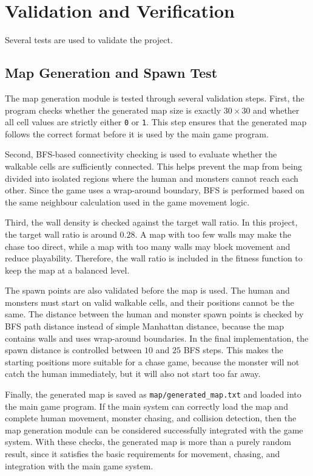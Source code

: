 \section{Validation and Verification}

Several tests are used to validate the project.

\subsection{Map Generation and Spawn Test}

The map generation module is tested through several validation steps. First, the program checks whether the generated map size is exactly $30 \times 30$ and whether all cell values are strictly either \texttt{0} or \texttt{1}. This step ensures that the generated map follows the correct format before it is used by the main game program.

Second, BFS-based connectivity checking is used to evaluate whether the walkable cells are sufficiently connected. This helps prevent the map from being divided into isolated regions where the human and monsters cannot reach each other. Since the game uses a wrap-around boundary, BFS is performed based on the same neighbour calculation used in the game movement logic.

Third, the wall density is checked against the target wall ratio. In this project, the target wall ratio is around $0.28$. A map with too few walls may make the chase too direct, while a map with too many walls may block movement and reduce playability. Therefore, the wall ratio is included in the fitness function to keep the map at a balanced level.

The spawn points are also validated before the map is used. The human and monsters must start on valid walkable cells, and their positions cannot be the same. The distance between the human and monster spawn points is checked by BFS path distance instead of simple Manhattan distance, because the map contains walls and uses wrap-around boundaries. In the final implementation, the spawn distance is controlled between $10$ and $25$ BFS steps. This makes the starting positions more suitable for a chase game, because the monster will not catch the human immediately, but it will also not start too far away.

Finally, the generated map is saved as \texttt{map/generated\_map.txt} and loaded into the main game program. If the main system can correctly load the map and complete human movement, monster chasing, and collision detection, then the map generation module can be considered successfully integrated with the game system. With these checks, the generated map is more than a purely random result, since it satisfies the basic requirements for movement, chasing, and integration with the main game system.

